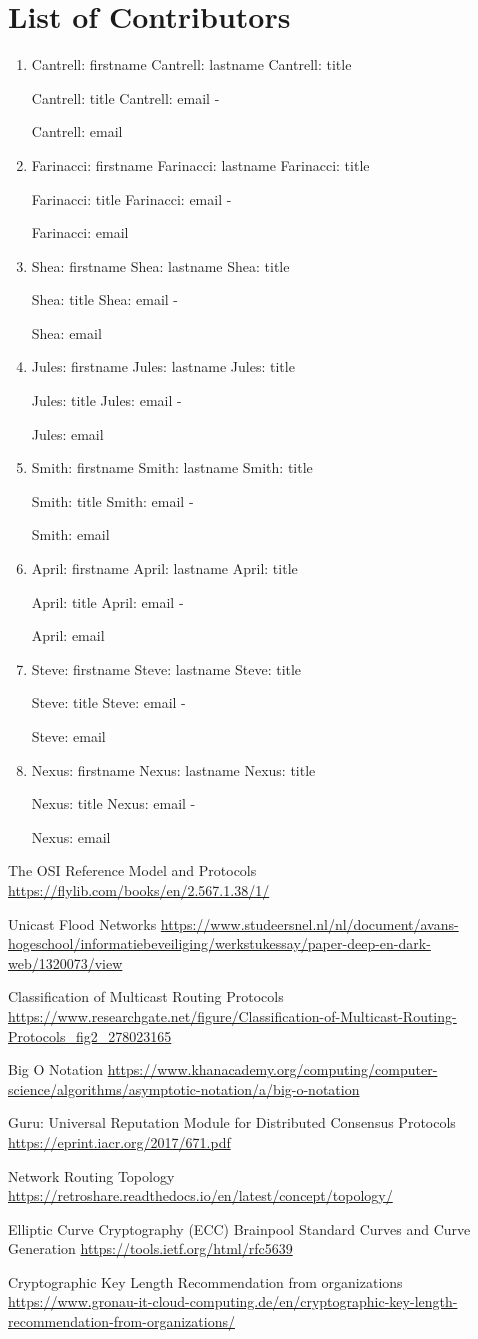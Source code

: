 \documentclass[11pt]{article}
\newcommand{\printcontributor}[1]{
  \begingroup
  \parindent 0pt
  \usevalue #1: firstname
  \space
  \usevalue #1: lastname
  \ifattribute #1: title {\par}{\relax}
  \usevalue #1: title
  \ifattribute #1: email {\space-\space} {\par\relax}
  \usevalue #1: email
  \endgroup
}
\begin{document}
\newpage

\section{List of Contributors}

\begingroup
\parindent 0pt
\parskip  8pt

\begin{enumerate}
\item 
\printcontributor{Cantrell}

\item
\printcontributor{Farinacci}

\item
\printcontributor{Shea}

\item
\printcontributor{Jules}

\item
\printcontributor{Smith}

\item
\printcontributor{April}

\item
\printcontributor{Steve}

\item
\printcontributor{Nexus}
\end{enumerate}

\endgroup


\pagebreak
\begin{thebibliography}{7}


The OSI Reference Model and Protocols
\url{https://flylib.com/books/en/2.567.1.38/1/}

Unicast Flood Networks
\url{https://www.studeersnel.nl/nl/document/avans-hogeschool/informatiebeveiliging/werkstukessay/paper-deep-en-dark-web/1320073/view}

Classification of Multicast Routing Protocols
\url{https://www.researchgate.net/figure/Classification-of-Multicast-Routing-Protocols_fig2_278023165}

Big O Notation
\url{https://www.khanacademy.org/computing/computer-science/algorithms/asymptotic-notation/a/big-o-notation}

Guru: Universal Reputation Module for Distributed Consensus Protocols
\url{https://eprint.iacr.org/2017/671.pdf}

Network Routing Topology
\url{https://retroshare.readthedocs.io/en/latest/concept/topology/}

Elliptic Curve Cryptography (ECC) Brainpool Standard Curves and Curve Generation
\url{https://tools.ietf.org/html/rfc5639}

Cryptographic Key Length Recommendation from organizations
\url{https://www.gronau-it-cloud-computing.de/en/cryptographic-key-length-recommendation-from-organizations/}

\end{thebibliography}
\end{document}
